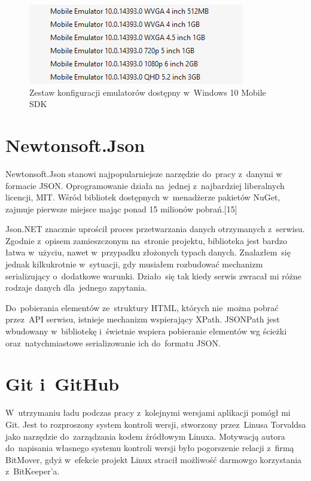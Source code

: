 \documentclass[a4paper,twoside,titlepage,openright]{book}
\begin{document}
\begin{figure}[htp]
	\centering
			\includegraphics[resolution=120]{emulatoryWin10.png}
		\caption{Zestaw konfiguracji emulatorów dostępny w~Windows 10 Mobile SDK}
		\label{fig:emulatoryWin10}
\end{figure}



\section{Newtonsoft.Json}

Newtonsoft.Json stanowi najpopularniejsze narzędzie do~pracy z~danymi w formacie JSON. Oprogramowanie działa na~jednej z~najbardziej liberalnych licencji, MIT.\cite{mitLicence} Wśród bibliotek dostępnych w~menadżerze pakietów NuGet, zajmuje pierwsze miejsce mając ponad 15 milionów pobrań.[15] 

Json.NET znacznie uprościł proces przetwarzania danych otrzymanych z~serwisu. Zgodnie z~opisem zamieszczonym na~stronie projektu, biblioteka jest bardzo łatwa w~użyciu, nawet w~przypadku złożonych typach danych. Znalazłem~się jednak kilkukrotnie w~sytuacji, gdy musiałem rozbudować mechanizm serializujący o~dodatkowe warunki. Działo~się tak kiedy serwis zwracał mi różne rodzaje danych dla~jednego zapytania. 

Do~pobierania elementów ze~struktury HTML, których nie~można pobrać przez~API serwisu, istnieje mechanizm wspierający XPath. JSONPath \cite{jsonPath} jest wbudowany w~bibliotekę i~świetnie wspiera pobieranie elementów wg ścieżki oraz~natychmiastowe serializowanie ich do~formatu JSON.


\section{Git i~GitHub}
W~utrzymaniu ładu podczas pracy z~kolejnymi wersjami aplikacji pomógł mi Git. Jest to rozproszony system kontroli wersji, stworzony przez~Linusa Torvaldsa jako narzędzie do~zarządzania kodem źródłowym Linuxa. Motywacją autora do~napisania własnego systemu kontroli wersji było pogorszenie relacji z~firmą BitMover, gdyż w~efekcie projekt Linux stracił możliwość darmowgo korzystania z~BitKeeper'a. 
\end{document}
